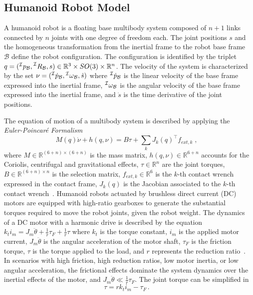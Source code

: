 \subsection{Humanoid Robot Model}
A humanoid robot is a floating base multibody system composed of $n+1$ links connected by $n$ joints with one degree of freedom each. The joint positions $s$ and the homogeneous transformation from the inertial frame to the robot base frame $\mathcal{B}$ define the robot configuration. The configuration is identified by the triplet $q = (\prescript{\mathcal{I}}{}{p}_\mathcal{B}, \prescript{\mathcal{I}}{}{R}_\mathcal{B}, s) \in  \mathbb{R}^3 \times SO(3) \times \mathbb{R}^n$. The velocity of the system is characterized by the set $\nu = (\prescript{\mathcal{I}}{}{\dot{p}}_\mathcal{B}, \prescript{\mathcal{I}}{}{\omega}_\mathcal{B}, \dot{s})$ where $\prescript{\mathcal{I}}{}{\dot{p}}_\mathcal{B}$ is the linear velocity of the base frame expressed into the inertial frame, $\prescript{\mathcal{I}}{}{\omega}_\mathcal{B}$ is the angular velocity of the base frame expressed into the inertial frame, and $\dot{s}$ is the time derivative of the joint positions.

The equation of motion of a multibody system is described by applying the \textit{Euler-Poincar\'e Formalism}
\begin{equation}
M(q) \dot \nu + h(q, \nu) = B \tau + \sum_{k} {J_k(q)^\top f_{ext,k}} \; ,
\label{eq:robotdynamics}
\end{equation}
where \mbox{$M \in \mathbb{R}^{(6+n) \times (6+n)}$} is the mass matrix, \mbox{$h(q, \nu) \in \mathbb{R}^{6+n}$} accounts for the Coriolis, centrifugal and gravitational effects, $\tau \in \mathbb{R}^{n}$ are the joint torques, $B \in \mathbb{R}^{(6+n) \times n}$ is the selection matrix, $f_{ext,k} \in \mathbb{R}^6$ is the $k$-th contact wrench expressed in the contact frame, $J_k(q)$ is the Jacobian associated to the $k$-th contact wrench~\cite{featherstone2014rigid}.
Humanoid robots actuated by brushless direct current (DC) motors are equipped with high-ratio gearboxes to generate the substantial torques required to move the robot joints, given the robot weight. The dynamics of a DC motor with a harmonic drive is described by the equation $k_{t} i_m = J_m \ddot{\theta} + \frac{1}{r} \tau_F + \frac{1}{r} \tau$
where $k_t$ is the torque constant, $i_m$ is the applied motor current, $J_m \ddot{\theta}$ is the angular acceleration of the motor shaft, $\tau_F$ is the friction torque, $\tau$ is the torque applied to the load, and $r$ represents the reduction ratio~\cite{taghirad1996experimental}. In scenarios with high friction, high reduction ratios, low motor inertia, or low angular acceleration, the frictional effects dominate the system dynamics over the inertial effects of the motor, and $J_m \ddot{\theta} \ll \frac{1}{r} \tau_F$. The joint torque can be simplified in
\begin{equation}
\label{eq:HDmodel}
\tau = r k_t i_m -  \tau_F \, .
\end{equation}

